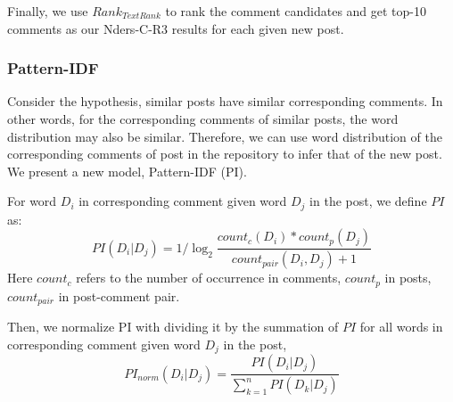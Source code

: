 \documentclass{sig-alternate}
\begin{document}
Finally, we use $Rank_{TextRank}$ to rank the comment candidates and get top-10 comments as our Nders-C-R3 results for each given new post.

\subsubsection{Pattern-IDF}
Consider the hypothesis, similar posts have similar corresponding comments. In 
other words, for the corresponding comments of similar posts, the word 
distribution may also be similar. Therefore, we can use word distribution of 
the corresponding comments of post in the repository to infer that of the new post. We present a new model, Pattern-IDF (PI).

For word $D_i$ in corresponding comment given word $D_j$ in the post, we define $PI$ as:
\begin{equation}
  PI(D_i|D_j) = 1 / \log_{2}{\frac{count_c(D_i) * count_p(D_j)}{count_{pair}(D_i, D_j) + 1}}
\end{equation}
Here $count_c$ refers to the number of occurrence in comments, $count_p$ in posts, $count_{pair}$ in post-comment pair.

Then, we normalize PI with dividing it by the summation of $PI$ for all words 
in corresponding comment given word $D_j$ in the post,
\begin{equation}
  PI_{norm}(D_i|D_j) = \frac{PI(D_i|D_j)}{\sum_{k=1}^n{PI(D_k|D_j)}}
\end{equation}
\end{document}
